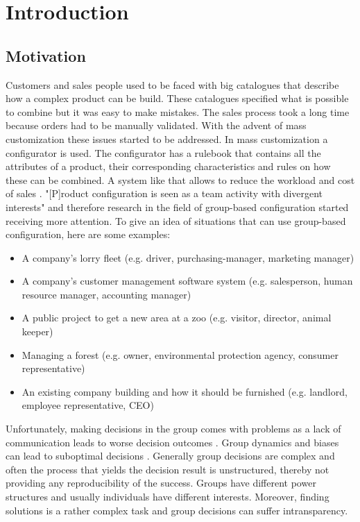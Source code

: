 \chapter{Introduction}
\label{ch:Introduction}

\section{Motivation}
\label{sec:Introduction:Goals}

Customers and sales people used to be faced with big catalogues that describe how a complex product can be build. These catalogues specified what is possible to combine but it was easy to make mistakes. The sales process took a long time because orders had to be manually validated. With the advent of mass customization these issues started to be addressed. In mass customization a configurator is used. The configurator has a rulebook that contains all the attributes of a product, their corresponding characteristics and rules on how these can be combined. A system like that allows to reduce the workload and cost of sales \cite{shafieeCostBenefitAnalysis2018}. "[P]roduct configuration is seen as a team activity with divergent interests" \cite{mendoncaCollaborativeProductConfiguration2008} and therefore research in the field of group-based configuration started receiving more attention. 
To give an idea of situations that can use group-based configuration, here are some examples:
\begin{itemize}
    \item A company's lorry fleet (e.g. driver, purchasing-manager, marketing manager)
    \item A company's customer management software system (e.g. salesperson, human resource manager, accounting manager)
    \item A public project to get a new area at a zoo (e.g. visitor, director, animal keeper)
    \item Managing a forest (e.g. owner, environmental protection agency, consumer representative)
    \item An existing company building and how it should be furnished (e.g. landlord, employee representative, CEO)
\end{itemize}

Unfortunately, making decisions in the group comes with problems as a lack of communication leads to worse decision outcomes \cite{atasItemRecommendationUsing2017}. Group dynamics and biases can lead to suboptimal decisions \cite{kerrBiasJudgmentComparing1996}.
Generally group decisions are complex and often the process that yields the decision result is unstructured, thereby not providing any reproducibility of the success. Groups have different power structures and usually individuals have different interests. Moreover, finding solutions is a rather complex task and group decisions can suffer intransparency.

